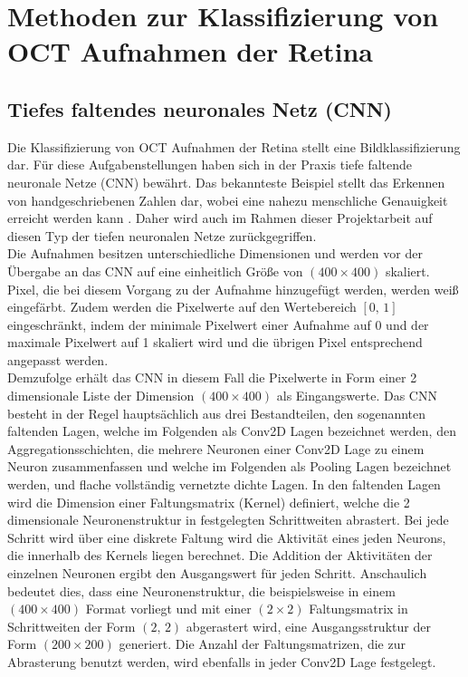 \section{Methoden zur Klassifizierung von OCT Aufnahmen der Retina}
\subsection{Tiefes faltendes neuronales Netz (CNN)}
Die Klassifizierung von OCT Aufnahmen der Retina stellt eine Bildklassifizierung dar. Für diese Aufgabenstellungen haben sich in der Praxis tiefe faltende neuronale Netze (CNN) bewährt. Das bekannteste Beispiel stellt das Erkennen von handgeschriebenen Zahlen dar, wobei eine nahezu menschliche Genauigkeit erreicht werden kann \cite{MNIST}. Daher wird auch im Rahmen dieser Projektarbeit auf diesen Typ der tiefen neuronalen Netze zurückgegriffen. \\
Die Aufnahmen besitzen unterschiedliche Dimensionen und werden vor der Übergabe an das CNN auf eine einheitlich Größe von $(400\times 400)$ skaliert. Pixel, die bei diesem Vorgang zu der Aufnahme hinzugefügt werden, werden weiß eingefärbt. Zudem werden die Pixelwerte auf den Wertebereich $[0,\,1]$ eingeschränkt, indem der minimale Pixelwert einer Aufnahme auf 0 und der maximale Pixelwert auf 1 skaliert wird und die übrigen Pixel entsprechend angepasst werden. \\ 
Demzufolge erhält das CNN in diesem Fall die Pixelwerte in Form einer 2 dimensionale Liste der Dimension $(400\times 400)$ als Eingangswerte. Das CNN besteht in der Regel hauptsächlich aus drei Bestandteilen, den sogenannten faltenden Lagen, welche im Folgenden als Conv2D Lagen bezeichnet werden, den Aggregationsschichten, die mehrere Neuronen einer Conv2D Lage zu einem Neuron zusammenfassen und welche im Folgenden als Pooling Lagen bezeichnet werden, und flache vollständig vernetzte dichte Lagen. In den faltenden Lagen wird die Dimension einer Faltungsmatrix (Kernel) definiert, welche die 2 dimensionale Neuronenstruktur in festgelegten Schrittweiten abrastert. Bei jede Schritt wird über eine diskrete Faltung wird die Aktivität eines jeden Neurons, die innerhalb des Kernels liegen berechnet. Die Addition der Aktivitäten der einzelnen Neuronen ergibt den Ausgangswert für jeden Schritt. Anschaulich bedeutet dies, dass eine Neuronenstruktur, die beispielsweise in einem $(400\times 400)$ Format vorliegt und mit einer $(2 \times 2)$ Faltungsmatrix in Schrittweiten der Form $(2,\,2)$ abgerastert wird, eine Ausgangsstruktur der Form $(200\times 200)$ generiert. Die Anzahl der Faltungsmatrizen, die zur Abrasterung benutzt werden, wird ebenfalls in jeder Conv2D Lage festgelegt.  \\
